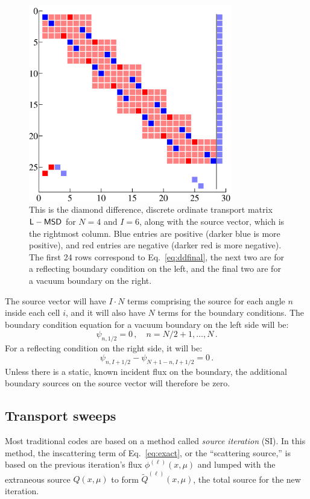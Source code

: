 \documentclass[11pt]{article}
\begin{document}
\begin{figure}[htb]
  \centering
  \includegraphics[width=3.5in]{matrix}
  \caption{This is the diamond difference, discrete ordinate transport matrix
  $\mathsf{L} - \mathsf{M} \mathsf{S} \mathsf{D}$
  for $N=4$ and $I=6$, along with the source vector, which is the rightmost
  column. Blue entries are positive (darker blue is more
  positive), and red entries are negative (darker red is more negative). The
  first 24 rows correspond to Eq.~\eqref{eq:ddfinal}, the next two are for a
  reflecting boundary condition on the left, and the final two are for a vacuum
  boundary on the right.}
  \label{fig:transportmatrix}
\end{figure}

The source vector will have $I\cdot N$ terms comprising the source for
each angle $n$ inside each cell $i$, and it will also have $N$ terms for the
boundary conditions.
The boundary condition equation for a vacuum boundary on the left side will be:
$$ \psi_{n,1/2} = 0 \,, \quad n= N/2 + 1, \ldots, N \,.$$
For a reflecting condition on the right side, it will be:
$$ \psi_{n,I+1/2} - \psi_{N+1-n,I+1/2} = 0 \,.$$
Unless there is a static, known incident flux on the boundary, the additional
boundary sources on the source vector will therefore be zero.
\subsection{Transport sweeps}
Most traditional codes are based on a method called \emph{source iteration}
(SI). In this method, the inscattering term of Eq.~\eqref{eq:exact},
or the ``scattering source,'' is based on the previous
iteration's flux $\phi^{(\ell)}(x,\mu)$ and lumped with the
extraneous source $Q(x,\mu)$ to form $\tilde{Q}^{(\ell)}(x,\mu)$, the total
source for the new iteration.
\end{document}
